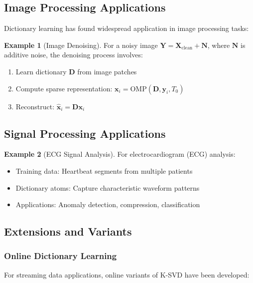 \documentclass[12pt]{article}
\renewcommand{\vec}[1]{\mathbf{#1}}
\theoremstyle{definition}
\newtheorem{example}{Example}[section]
\begin{document}
\subsection{Image Processing Applications}

Dictionary learning has found widespread application in image processing tasks:

\begin{example}[Image Denoising]
    For a noisy image $\mathbf{Y} = \mathbf{X}_{\text{clean}} + \mathbf{N}$, where $\mathbf{N}$ is additive noise, the denoising process involves:
    \begin{enumerate}
        \item Learn dictionary $\mathbf{D}$ from image patches
        \item Compute sparse representation: $\vec{x}_i = \text{OMP}(\mathbf{D}, \vec{y}_i, T_0)$
        \item Reconstruct: $\hat{\vec{x}}_i = \mathbf{D}\vec{x}_i$
    \end{enumerate}
\end{example}

\subsection{Signal Processing Applications}

\begin{example}[ECG Signal Analysis]
    For electrocardiogram (ECG) analysis:
    \begin{itemize}
        \item Training data: Heartbeat segments from multiple patients
        \item Dictionary atoms: Capture characteristic waveform patterns
        \item Applications: Anomaly detection, compression, classification
    \end{itemize}
\end{example}

\subsection{Extensions and Variants}

\subsubsection{Online Dictionary Learning}

For streaming data applications, online variants of K-SVD have been developed:
\end{document}
